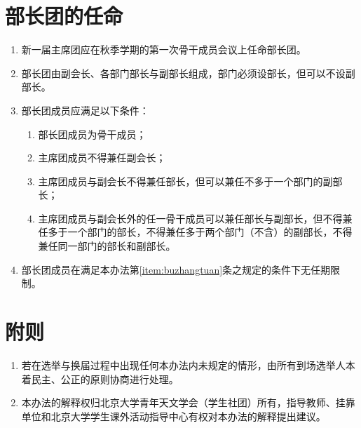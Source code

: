 \section{部长团的任命}

\begin{enumerate}[resume]
    \item 新一届主席团应在秋季学期的第一次骨干成员会议上任命部长团。
    
    \item 部长团由副会长、各部门部长与副部长组成，部门必须设部长，但可以不设副部长。
    
    \item 部长团成员应满足以下条件：\label{item:buzhangtuan}
    
    \begin{enumerate}
        \item 部长团成员为骨干成员；
        \item 主席团成员不得兼任副会长；
        \item 主席团成员与副会长不得兼任部长，但可以兼任不多于一个部门的副部长；
        \item 主席团成员与副会长外的任一骨干成员可以兼任部长与副部长，但不得兼任多于一个部门的部长，不得兼任多于两个部门（不含）的副部长，不得兼任同一部门的部长和副部长。
    \end{enumerate}
    
    \item 部长团成员在满足本办法第\ref{item:buzhangtuan}条之规定的条件下无任期限制。
\end{enumerate}

\section{附则}

\begin{enumerate}[resume]
    \item 若在选举与换届过程中出现任何本办法内未规定的情形，由所有到场选举人本着民主、公正的原则协商进行处理。
    
    \item 本办法的解释权归北京大学青年天文学会（学生社团）所有，指导教师、挂靠单位和北京大学学生课外活动指导中心有权对本办法的解释提出建议。
\end{enumerate}
